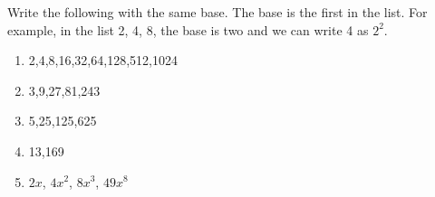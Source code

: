           \label{m39253*id155428}Write the following with the same
base. The base is the first in the list. For example, in the list 2, 4, 8, the
base is two and we can write 4 as \begin{math}{2}^{2}\end{math}.\par 
          \label{m39253*id155449}\begin{enumerate}[noitemsep, label=\textbf{\arabic*}. ] 
            \label{m39253*uid66}\item 2,4,8,16,32,64,128,512,1024
\label{m39253*uid67}\item 3,9,27,81,243
\label{m39253*uid68}\item 5,25,125,625
\label{m39253*uid69}\item 13,169
\label{m39253*uid70}\item \begin{math}2x\end{math}, \begin{math}4{x}^{2}\end{math}, \begin{math}8{x}^{3}\end{math}, \begin{math}49{x}^{8}\end{math}\end{enumerate}
        
          

\par
            \label{m39253*secfhsst!!!underscore!!!id3348}\vspace{.5cm} 
      
